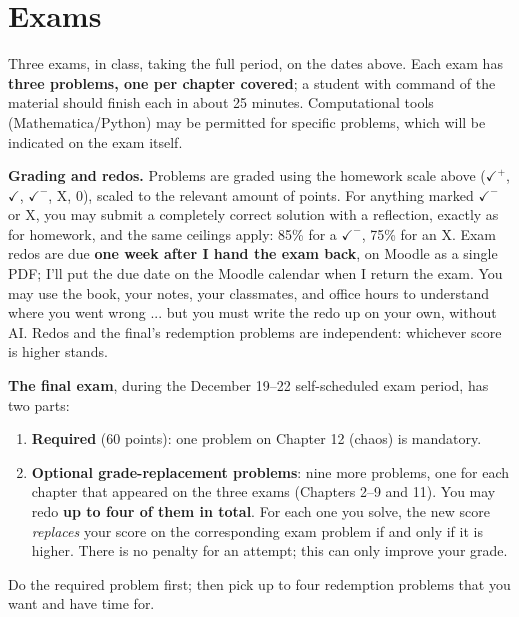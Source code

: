 \section{Exams}
%
Three exams, in class, taking the full period, on the dates above. Each
exam has \textbf{three problems, one per chapter covered}; a student with
command of the material should finish each in about 25 minutes. Computational
tools (Mathematica/Python) may be permitted for specific problems, which will be
indicated on the exam itself.

\medskip \textbf{Grading and redos.} Problems are graded using the homework
scale above ($\checkmark^{+}$, $\checkmark$, $\checkmark^{-}$, X, 0), scaled to the relevant amount of
points. For anything marked $\checkmark^{-}$ or X, you may submit a completely correct
solution with a reflection, exactly as for homework, and the same ceilings
apply: 85\% for a $\checkmark^{-}$, 75\% for an X. Exam redos are due \textbf{one week
  after I hand the exam back}, on Moodle as a single PDF; I'll put the due date on
the Moodle calendar when I return the exam. You may use the book, your notes,
your classmates, and office hours to understand where you went wrong ... but you
must write the redo up on your own, without AI. Redos and the final's redemption
problems are independent: whichever score is higher stands.

\medskip
\textbf{The final exam}, during the December 19--22 self-scheduled exam
period, has two parts:
\begin{enumerate}
  \item \textbf{Required} (60 points): one problem on Chapter 12 (chaos) is
    mandatory.
    
  \item \textbf{Optional grade-replacement problems}: nine more problems,
    one for each chapter that appeared on the three exams (Chapters 2--9
    and 11). You may redo \textbf{up to four of them in total}. For each
    one you solve, the new score
    \emph{replaces} your score on the corresponding exam problem if and
    only if it is higher. There is no penalty for an attempt; this can
    only improve your grade.
\end{enumerate}
Do the required problem first; then pick up to four redemption problems
that you want and have time for.

